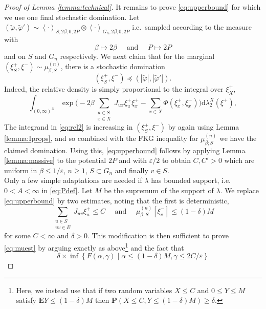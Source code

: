 \documentclass{article}
\numberwithin{equation}{section}
\theoremstyle{definition}
\theoremstyle{definition}
\theoremstyle{remark}
\renewcommand{\d}{\mathrm{d}}
\newcommand{\E}{\mathbb{E}}
\newcommand\vp{\varphi}
\renewcommand{\d}{\mathrm{d}}
\renewcommand{\l}{\lambda}
\newcommand{\I}{\Phi}
\renewcommand{\P}{\mathrm{\mathbf{P}}}
\renewcommand{\E}{\mathrm{\mathbf{E}}}
\renewcommand{\L}{\xi}
\newcommand{\vps}{ \widetilde{\vp}}
\newcommand{\eps}{\varepsilon}
\begin{document}
\begin{proof}[Proof of Lemma \ref{lemma:technical}]
	It remains to prove \eqref{eq:upperbound} for which we use one final stochastic domination. Let $(\vps,\vps') \sim \left< \cdot \right>_{S,2\beta,0,2P} \otimes \left< \cdot \right>_{G_n,2\beta,0,2P}$ i.e.~sampled according to the measure with
	\[
		\beta \mapsto 2\beta \quad\text{ and }\quad P \mapsto 2P
	\]
	and on $S$ and $G_n$ respectively. We next claim that for the marginal $(\L^+_S,\L^-) \sim \mu_{\beta;S}^{(n)}$, there is a stochastic domination
	\begin{equation}\label{eq:twodom}
		(\L^+_S,\L^-) \preceq (|\vps|,|\vps'|).
	\end{equation}
	Indeed, the relative density is simply proportional to the integral over $\L^+_X$,  
	\begin{equation}\label{eq:rel2}
		\int_{(0,\infty)^{X}} \exp\Big( -2\beta \textstyle\sum_{\substack{u \in S \\ x \in X}} J_{ux} \L^+_u \L^+_x - \textstyle\sum_{x \in X} \I(\L^+_x,\L^-_x)\Big)  \d\l_2^X(\L^+),
	\end{equation}
	The integrand in \eqref{eq:rel2} is increasing in $(\L^+_S,\L^-)$ by again using Lemma \ref{lemma:Iprops}, and so combined with the FKG inequality for $\mu_{\beta;S}^{(n)}$ we have the claimed domination.  
	Using this, \eqref{eq:upperbound} follows by applying Lemma \ref{lemma:massive} to the potential $2P$ and with  $\eps/2$ to obtain $C,C' > 0$ which are uniform in $\beta \leq 1 / \eps$, $n \geq 1$, $S \subset G_n$ and finally $v \in S$.
	\\[1em]
	\noindent Only a few simple adaptations are needed if $\l$ has bounded support, i.e.~$0 < A < \infty$ in \eqref{eq:Pdef}. Let $M$ be the supremum of the support of $\l$. We replace \eqref{eq:upperbound} by two estimates, noting that the first is deterministic, 
	\begin{equation}\label{eq:upperbound2}
		\sum_{\substack{u \in S \\ uv \in E}} J_{uv} \L^+_u  \leq C \quad\text{ and }\quad \mu_{\beta;S}^{(n)}\left[ \L^-_v \right] \leq (1-\delta)M
	\end{equation} 
	for some $C < \infty$ and $\delta > 0$. This modification is then sufficient to prove \eqref{eq:muest} by arguing exactly as above{\hypersetup{linkcolor=black}\footnote{Here, we instead use that if two random variables $X \leq C$ and $0 \leq Y \leq M$ satisfy $\E Y \leq (1-\delta)M$ then $\P(X \leq C, Y \leq (1-\delta)M ) \geq \delta$.}} and the fact that
	\[
		\delta \times \inf \left\{ F(\alpha,\gamma) \mid \alpha \leq (1-\delta)M, \gamma \leq {2C} / \eps  \right\}
\]
\end{proof}
\end{document}

